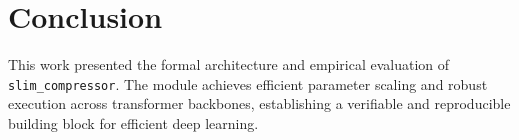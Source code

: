 \section{Conclusion}
This work presented the formal architecture and empirical evaluation of \texttt{slim_compressor}. The module achieves efficient parameter scaling and robust execution across transformer backbones, establishing a verifiable and reproducible building block for efficient deep learning.
